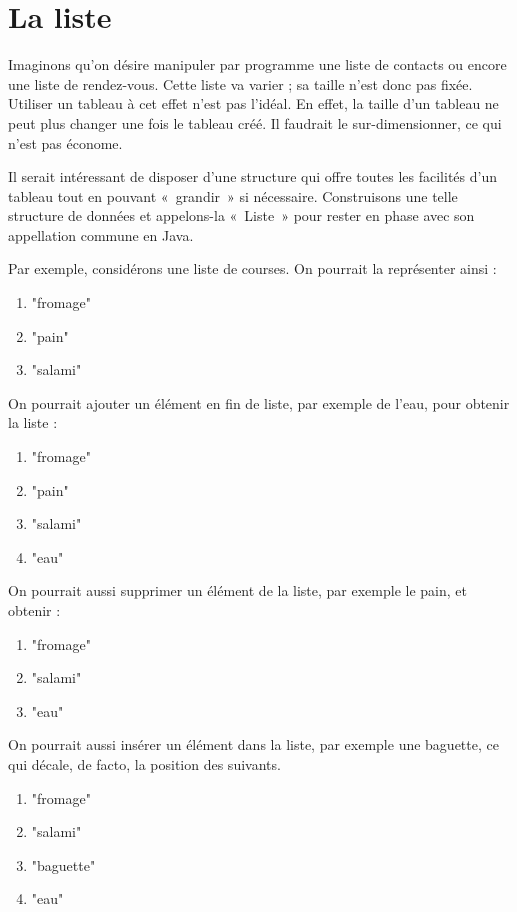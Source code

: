 \chapter{La liste}

	
	Imaginons qu’on désire manipuler par programme une liste de contacts ou
	encore une liste de rendez-vous. Cette liste va varier ; sa taille
	n’est donc pas fixée. Utiliser un tableau à cet effet n’est pas l’idéal. 
	En effet, la taille d’un tableau ne peut plus changer une fois le tableau créé. 
	Il faudrait le sur-dimensionner, ce qui n’est pas économe.
	
	Il serait intéressant de disposer d’une structure qui offre toutes les
	facilités d’un tableau tout en pouvant «~grandir~» si nécessaire.
	Construisons une telle structure de données et appelons-la «~Liste~»
	pour rester en phase avec son appellation commune en Java.
	
	Par exemple, considérons une liste de courses.
	On pourrait la représenter ainsi :
	\begin{enumerate}
	\item "fromage"
	\item "pain"
	\item "salami"
	\end{enumerate}
	
	On pourrait ajouter un élément en fin de liste, par exemple de l'eau,
	pour obtenir la liste :
	
	\begin{enumerate}
	\item "fromage"
	\item "pain"
	\item "salami"
	\item "eau"
	\end{enumerate}
	
	On pourrait aussi supprimer un élément de la liste, par exemple le pain,
	et obtenir :
	
	\begin{enumerate}
	\item "fromage"
	\item "salami"
	\item "eau"
	\end{enumerate}
	
	On pourrait aussi insérer un élément dans la liste, 
	par exemple une baguette, 
	ce qui décale, de facto, la position des suivants.
	
	\begin{enumerate}
	\item "fromage"
	\item "salami"
	\item "baguette"
	\item "eau"
	\end{enumerate}
	
